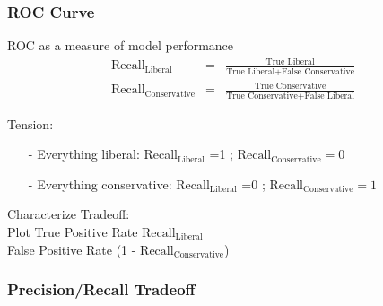\documentclass{beamer}
\numberwithin{equation}{section}
\begin{document}










\begin{frame}
\frametitle{ROC Curve}

ROC as a measure of model performance
\begin{eqnarray}
\text{Recall}_{\text{Liberal}} & = & \frac{\text{True Liberal}  } {\text{True Liberal} + \text{False Conservative}  }\nonumber \\
\text{Recall}_{\text{Conservative}} & =  & \frac{\text{True Conservative}  } {\text{True Conservative} + \text{False Liberal}  }\nonumber
\end{eqnarray}

\alert{Tension}:
\begin{itemize}
\item[-] Everything liberal: Recall$_{\text{Liberal}}$ =1 ; $\text{Recall}_{\text{Conservative}}=0$
\item[-] Everything conservative: Recall$_{\text{Liberal}}$ =0 ; $\text{Recall}_{\text{Conservative}}=1$
\end{itemize}

Characterize Tradeoff: \\
Plot True Positive Rate $\text{Recall}_{\text{Liberal}}$ \\
 False Positive Rate (1 - $\text{Recall}_{\text{Conservative}}$)



\end{frame}




\begin{frame}
\frametitle{Precision/Recall Tradeoff}



\end{frame}
\end{document}
